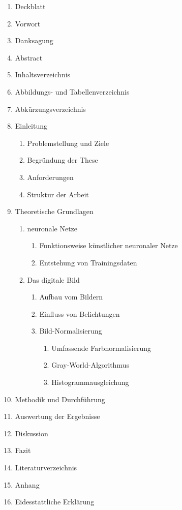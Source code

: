 \documentclass[a4paper,12pt,oneside]{article}
\begin{document}
  \begin{enumerate} %
  \item Deckblatt
  \item Vorwort
  \item Danksagung
  \item Abstract
  \item Inhaltsverzeichnis
  \item Abbildungs- und Tabellenverzeichnis
  \item Abkürzungsverzeichnis
  
  \item Einleitung
  \begin{enumerate} %
  \item Problemstellung und Ziele
  \item Begründung der These
  \item Anforderungen
  \item Struktur der Arbeit
  \end{enumerate} %
  \item Theoretische Grundlagen
  \begin{enumerate} %
  \item neuronale Netze
  \begin{enumerate} %
  \item Funktionsweise künstlicher neuronaler Netze
  \item Entstehung von Trainingsdaten
  \end{enumerate} %
  \item Das digitale Bild
  \begin{enumerate} %
  \item Aufbau vom Bildern
  \item Einfluss von Belichtungen
  \item Bild-Normalisierung
  \begin{enumerate}
  \item Umfassende Farbnormalisierung 
  \item Gray-World-Algorithmus
  \item Histogrammausgleichung
  \end{enumerate}
  \end{enumerate} %
  \end{enumerate} %
  \item Methodik und Durchführung
  \item Auswertung der Ergebnisse
  \item Diskussion
  \item Fazit
  
  \item Literaturverzeichnis
  \item Anhang
  \item Eidesstattliche Erklärung
  \end{enumerate} \vspace{2 cm} %
 
\end{document}
